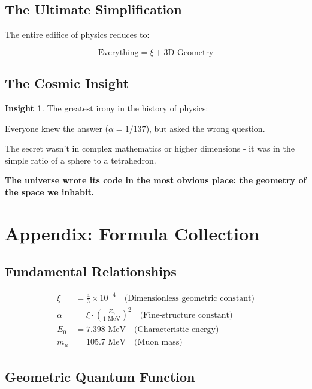 \documentclass[12pt,a4paper]{article}
\theoremstyle{definition}
\newtheorem{insight}{Insight}[section]
\begin{document}
	\subsection{The Ultimate Simplification}
	
	The entire edifice of physics reduces to:
	
	\begin{equation}
		\boxed{\text{Everything} = \xi + \text{3D Geometry}}
	\end{equation}
	
	\subsection{The Cosmic Insight}
	
	\begin{insight}
		The greatest irony in the history of physics:
		
		Everyone knew the answer ($\alpha = 1/137$), but asked the wrong question.
		
		The secret wasn't in complex mathematics or higher dimensions - it was in the simple ratio of a sphere to a tetrahedron.
		
		\textbf{The universe wrote its code in the most obvious place: the geometry of the space we inhabit.}
	\end{insight}
	
	\newpage
	\section{Appendix: Formula Collection}
	
	\subsection{Fundamental Relationships}
	
	\begin{align}
		\xi &= \frac{4}{3} \times 10^{-4} \quad \text{(Dimensionless geometric constant)}\\
		\alpha &= \xi \cdot \left(\frac{E_0}{1 \text{ MeV}}\right)^2 \quad \text{(Fine-structure constant)}\\
		E_0 &= 7.398 \text{ MeV} \quad \text{(Characteristic energy)}\\
		m_\mu &= 105.7 \text{ MeV} \quad \text{(Muon mass)}
	\end{align}
	
	\subsection{Geometric Quantum Function}
	
\end{document}
